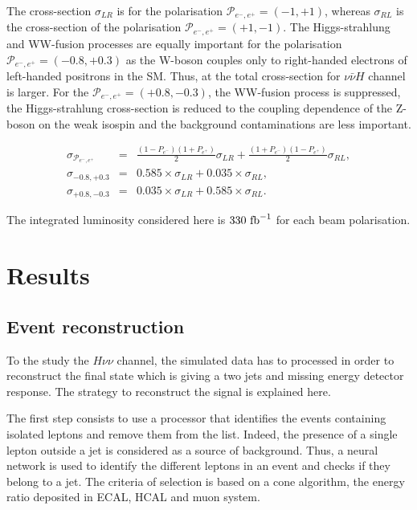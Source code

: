    The cross-section $\sigma_{LR}$ is for the polarisation $\mathcal{P}_{e^-,e^+} = (-1,+1)$, whereas $\sigma_{RL}$ is the cross-section of the polarisation $\mathcal{P}_{e^-,e^+} = (+1,-1)$.
   The Higgs-strahlung and WW-fusion processes are equally important for the polarisation $\mathcal{P}_{e^-,e^+} = (-0.8,+0.3)$ as the W-boson couples only to right-handed electrons of left-handed positrons in the \gls{SM}.
   Thus, at the total cross-section for $\nu\bar{\nu}H$ channel is larger.
   For the  $\mathcal{P}_{e^-,e^+} = (+0.8,-0.3)$, the WW-fusion process is suppressed, the Higgs-strahlung cross-section is reduced to the coupling dependence of the Z-boson on the weak isospin and the background contaminations are less important.

   \begin{equation}
     \begin{array}{lrc}
     \sigma_{\mathcal{P}_{e^-,e^+}} & = & \frac{(1 - P_{e^-})(1+P_{e^+})}{2} \sigma_{LR} + \frac{(1+P_{e^-})(1-P_{e^+})}{2} \sigma_{RL}, \\
     \sigma_{-0.8,+0.3} & = & 0.585 \times \sigma_{LR} + 0.035 \times \sigma_{RL}, \\
     \sigma_{+0.8,-0.3} & = & 0.035 \times \sigma_{LR} + 0.585 \times \sigma_{RL}.
     \end{array}
   \end{equation}

   The integrated luminosity considered here is $330~\rm{fb}^{-1}$ for each beam polarisation.

  \section{Results}
 
    \subsection{Event reconstruction}

    To the study the $H \nu\nu$ channel, the simulated data has to processed in order to reconstruct the final state which is giving a two jets and missing energy detector response.
    The strategy to reconstruct the signal is explained here.
    
    The first step consists to use a processor that identifies the events containing isolated leptons and remove them from the list.
    Indeed, the presence of a single lepton outside a jet is considered as a source of background.
    Thus, a neural network is used to identify the different leptons in an event and checks if they belong to a jet.
    The criteria of selection is based on a cone algorithm, the energy ratio deposited in ECAL, HCAL and muon system.

